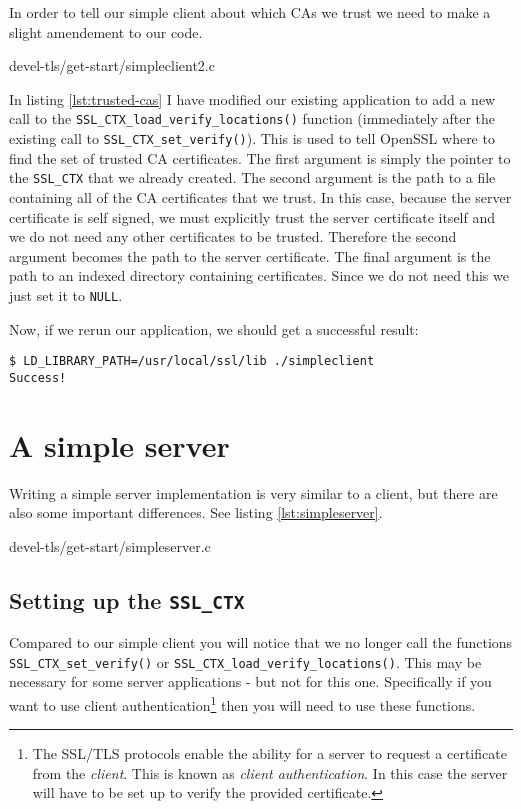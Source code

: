 In order to tell our simple client about which CAs we trust we need to make a 
slight amendement to our code.


{devel-tls/get-start/simpleclient2.c}

In listing \ref{lst:trusted-cas} I have modified our existing application to add
a new call to the \verb!SSL_CTX_load_verify_locations()! function (immediately
after the existing call to \verb!SSL_CTX_set_verify()!). This is used to tell 
OpenSSL where to find the set of trusted CA certificates. The first argument is
simply the pointer to the \verb!SSL_CTX! that we already created. The second
argument is the path to a file containing all of the CA certificates that we
trust. In this case, because the server certificate is self signed, we must
explicitly trust the server certificate itself and we do not need any other
certificates to be trusted. Therefore the second argument becomes the path to 
the server certificate. The final argument is the path to an indexed directory 
containing certificates. Since we do not need this we just set it to 
\verb!NULL!.

Now, if we rerun our application, we should get a successful result:

\begin{verbatim}
$ LD_LIBRARY_PATH=/usr/local/ssl/lib ./simpleclient
Success!
\end{verbatim}

\section{A simple server}

Writing a simple server implementation is very similar to a client, but there 
are also some important differences. See listing \ref{lst:simpleserver}.


{devel-tls/get-start/simpleserver.c}

\subsection{Setting up the \texttt{SSL\_CTX}}
\label{sec:get-start-setup-ssl-ctx}

Compared to our simple client you will notice that we no longer call the 
functions \verb!SSL_CTX_set_verify()! or \verb!SSL_CTX_load_verify_locations()!.
This may
be necessary for some server applications - but not for this one. Specifically 
if you want to use client authentication\footnote{The SSL/TLS protocols enable 
the ability for a server to request a certificate from the \emph{client}. This 
is known as \emph{client authentication}. In this case the server will have to 
be set up to verify the provided certificate.} then you will need to use these 
functions.

